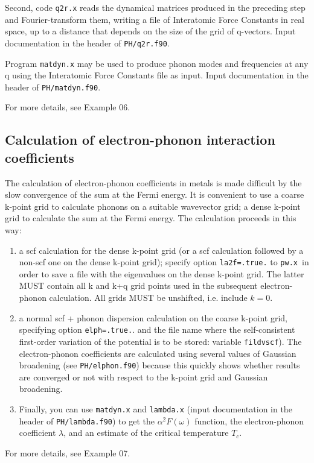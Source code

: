 \documentclass[12pt,a4paper]{article}
\def\pwx{\texttt{pw.x}}
\begin{document}
Second, code \texttt{q2r.x} reads the dynamical matrices produced in the
preceding step and Fourier-transform them, writing a file of Interatomic Force
Constants in real space, up to a distance that depends on the size of the grid
of q-vectors. Input documentation in the header of \texttt{PH/q2r.f90}.

Program \texttt{matdyn.x} may be used to produce phonon modes and
frequencies at any q using the Interatomic Force Constants file as input.
Input documentation in the header of \texttt{PH/matdyn.f90}.

For more details, see Example 06.

\subsection{Calculation of electron-phonon interaction coefficients}

The calculation of electron-phonon coefficients in metals is made difficult 
by the slow convergence of the sum at the Fermi energy. It is convenient to 
use a coarse k-point grid to calculate phonons on a suitable wavevector grid;
a dense k-point grid to calculate the sum at the Fermi energy. The calculation
proceeds in this way:
\begin{enumerate}
\item a scf calculation for the dense k-point grid (or a scf calculation 
followed by a non-scf one on the dense k-point grid); specify 
option \texttt{la2f=.true.} to \pwx\ in order to save a file with 
the eigenvalues on the dense k-point grid. The latter MUST contain 
all k and k+q grid points used in the subsequent electron-phonon 
calculation. All grids MUST be unshifted, i.e. include $k=0$.
\item a normal scf + phonon dispersion calculation on the coarse k-point
grid, specifying option \texttt{elph=.true.}. and the file name where
the self-consistent first-order variation of the potential is to be 
stored: variable \texttt{fildvscf}).
The electron-phonon coefficients are calculated using several
values of Gaussian broadening (see \texttt{PH/elphon.f90}) because this quickly
shows whether results are converged or not with respect to the k-point grid
and Gaussian broadening.
\item Finally, you can use \texttt{matdyn.x} and \texttt{lambda.x} 
(input documentation in the header of \texttt{PH/lambda.f90})
to get the $\alpha^2F(\omega)$ function, the electron-phonon coefficient
$\lambda$, and an estimate of the critical temperature $T_c$.
\end{enumerate}
For more details, see Example 07.
\end{document}
